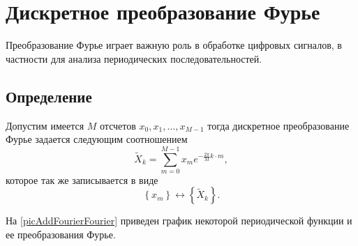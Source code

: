 \section{Дискретное преобразование Фурье}
\label{AddFourier}

Преобразование Фурье играет важную
роль в обработке цифровых сигналов, в частности для анализа
периодических последовательностей.
\subsection{Определение}
\begin{definition}
Допустим имеется $M$ отсчетов $x_0, x_1, \dots, x_{M-1}$ тогда
дискретное преобразование Фурье задается следующим соотношением
\begin{equation}
\tilde{X}_k = \sum^{M - 1}_{m = 0} x_m e^{-\frac{2 \pi}{M} k\cdot m},
\label{eqAddFourierDiscretFourier}
\end{equation}
которое так же записывается в виде
\begin{equation}
\left\{x_m\right\} \longleftrightarrow \left\{\tilde{X}_k\right\}.
\nonumber
\end{equation}
\end{definition}

На \autoref{picAddFourierFourier} приведен график некоторой
периодической функции и ее преобразования Фурье. 



